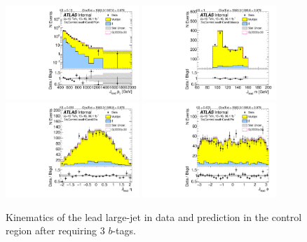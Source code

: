 \clearpage

\begin{figure}[htbp!]
\begin{center}
\includegraphics[width=0.45\textwidth,angle=-90]{figures/boosted/Control/b77_ThreeTag_Control_leadHCand_Pt_m_1.pdf}
\includegraphics[width=0.45\textwidth,angle=-90]{figures/boosted/Control/b77_ThreeTag_Control_leadHCand_Mass_s.pdf}\\
\includegraphics[width=0.45\textwidth,angle=-90]{figures/boosted/Control/b77_ThreeTag_Control_leadHCand_Eta.pdf}
\includegraphics[width=0.45\textwidth,angle=-90]{figures/boosted/Control/b77_ThreeTag_Control_leadHCand_Phi.pdf}
  \caption{Kinematics of the lead large-\R jet in data and prediction in the control region after requiring 3 $b$-tags. }
  \label{fig:boosted-3b-control-ak10-lead}
\end{center}
\end{figure}

